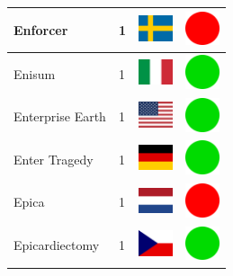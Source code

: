 \documentclass[12pt, a4paper, twoside]{report}
\begin{document}
\begin{center}
\begin{longtable}{|p{5cm}|p{2cm}|p{2cm}|p{2cm}|}
			Enforcer & 1 & \includegraphics[width=1cm]{4x3/se} & \includegraphics[width=1cm]{likes/n} \\ \hline
			Enisum & 1 & \includegraphics[width=1cm]{4x3/it} & \includegraphics[width=1cm]{likes/y} \\ \hline
			Enterprise Earth & 1 & \includegraphics[width=1cm]{4x3/us} & \includegraphics[width=1cm]{likes/y} \\ \hline
			Enter Tragedy & 1 & \includegraphics[width=1cm]{4x3/de} & \includegraphics[width=1cm]{likes/y} \\ \hline
			Epica & 1 & \includegraphics[width=1cm]{4x3/nl} & \includegraphics[width=1cm]{likes/n} \\ \hline
			Epicardiectomy & 1 & \includegraphics[width=1cm]{4x3/cz} & \includegraphics[width=1cm]{likes/y} \\ \hline

\end{longtable}
\end{center}
\end{document}
